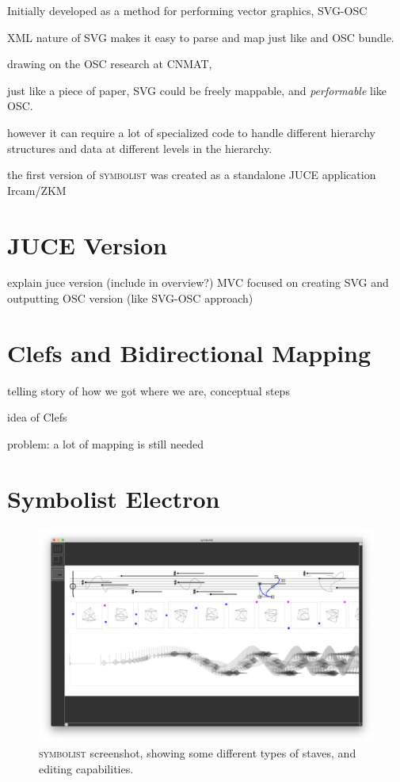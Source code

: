 \documentclass{article}
\def\symbolist{\textsc{symbolist}\xspace}
\begin{document}
Initially developed as a method for performing vector graphics, 
SVG-OSC

XML nature of SVG makes it easy to parse and map just like and OSC bundle.

drawing on the OSC research at CNMAT, 

just like a piece of paper, SVG could be freely mappable, and \textit{performable} like OSC.





however it can require a lot of specialized code to handle different hierarchy structures and data at different levels in the hierarchy.


the first version of \symbolist was created as a standalone JUCE application
Ircam/ZKM \cite{gottfried2018symbolist}

\section{JUCE Version}\label{sec:juce_version}

explain juce version (include in overview?)
MVC
focused on creating SVG and outputting OSC version (like SVG-OSC approach)


\section{Clefs and Bidirectional Mapping}\label{sec:bidirectional_mapping}

telling story of how we got where we are, conceptual steps

idea of Clefs

problem:
a lot of mapping is still needed



\section{Symbolist Electron}\label{sec:symbolist_electron}

\begin{figure}[ht!]
\centering
\includegraphics[width=2\columnwidth]{symbolist.png}
\caption{ \symbolist screenshot, showing some different types of staves, and editing capabilities.
\label{fig:screenshot}}
\end{figure}
\end{document}
